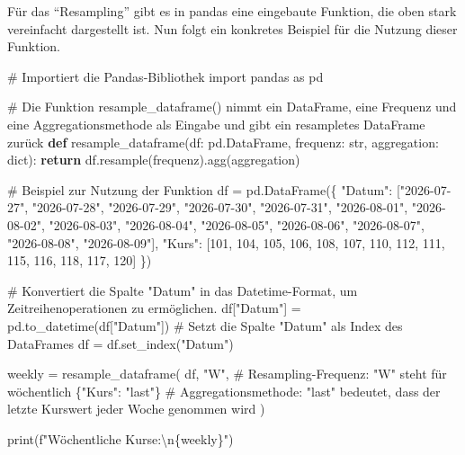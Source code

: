 \documentclass[
  ngerman,
  a4paper,
  DIV=11,
  oneside]{scrreprt}
\newenvironment{Shaded}{\begin{snugshade}}{\end{snugshade}}
\newcommand{\BuiltInTok}[1]{\textcolor[rgb]{0.00,0.23,0.31}{#1}}
\newcommand{\CharTok}[1]{\textcolor[rgb]{0.13,0.47,0.30}{#1}}
\newcommand{\CommentTok}[1]{\textcolor[rgb]{0.37,0.37,0.37}{#1}}
\newcommand{\ControlFlowTok}[1]{\textcolor[rgb]{0.00,0.23,0.31}{\textbf{#1}}}
\newcommand{\DecValTok}[1]{\textcolor[rgb]{0.68,0.00,0.00}{#1}}
\newcommand{\ImportTok}[1]{\textcolor[rgb]{0.00,0.46,0.62}{#1}}
\newcommand{\KeywordTok}[1]{\textcolor[rgb]{0.00,0.23,0.31}{\textbf{#1}}}
\newcommand{\NormalTok}[1]{\textcolor[rgb]{0.00,0.23,0.31}{#1}}
\newcommand{\OperatorTok}[1]{\textcolor[rgb]{0.37,0.37,0.37}{#1}}
\newcommand{\SpecialCharTok}[1]{\textcolor[rgb]{0.37,0.37,0.37}{#1}}
\newcommand{\SpecialStringTok}[1]{\textcolor[rgb]{0.13,0.47,0.30}{#1}}
\newcommand{\StringTok}[1]{\textcolor[rgb]{0.13,0.47,0.30}{#1}}
\begin{document}
Für das ``Resampling'' gibt es in pandas eine eingebaute Funktion, die
oben stark vereinfacht dargestellt ist. Nun folgt ein konkretes Beispiel
für die Nutzung dieser Funktion.

\begin{Shaded}
\begin{Highlighting}[]
\CommentTok{\# Importiert die Pandas{-}Bibliothek}
\ImportTok{import}\NormalTok{ pandas }\ImportTok{as}\NormalTok{ pd}

\CommentTok{\# Die Funktion resample\_dataframe() nimmt ein DataFrame, eine Frequenz und eine Aggregationsmethode als Eingabe und gibt ein resampletes DataFrame zurück}
\KeywordTok{def}\NormalTok{ resample\_dataframe(df: pd.DataFrame, frequenz: }\BuiltInTok{str}\NormalTok{, aggregation: }\BuiltInTok{dict}\NormalTok{):}
    \ControlFlowTok{return}\NormalTok{ df.resample(frequenz).agg(aggregation)}

\CommentTok{\# Beispiel zur Nutzung der Funktion}
\NormalTok{df }\OperatorTok{=}\NormalTok{ pd.DataFrame(\{}
    \StringTok{"Datum"}\NormalTok{: [}\StringTok{"2026{-}07{-}27"}\NormalTok{, }\StringTok{"2026{-}07{-}28"}\NormalTok{, }\StringTok{"2026{-}07{-}29"}\NormalTok{, }\StringTok{"2026{-}07{-}30"}\NormalTok{, }\StringTok{"2026{-}07{-}31"}\NormalTok{, }\StringTok{"2026{-}08{-}01"}\NormalTok{, }\StringTok{"2026{-}08{-}02"}\NormalTok{, }\StringTok{"2026{-}08{-}03"}\NormalTok{, }\StringTok{"2026{-}08{-}04"}\NormalTok{, }\StringTok{"2026{-}08{-}05"}\NormalTok{, }\StringTok{"2026{-}08{-}06"}\NormalTok{, }\StringTok{"2026{-}08{-}07"}\NormalTok{, }\StringTok{"2026{-}08{-}08"}\NormalTok{, }\StringTok{"2026{-}08{-}09"}\NormalTok{],}
    \StringTok{"Kurs"}\NormalTok{: [}\DecValTok{101}\NormalTok{, }\DecValTok{104}\NormalTok{, }\DecValTok{105}\NormalTok{, }\DecValTok{106}\NormalTok{, }\DecValTok{108}\NormalTok{, }\DecValTok{107}\NormalTok{, }\DecValTok{110}\NormalTok{, }\DecValTok{112}\NormalTok{, }\DecValTok{111}\NormalTok{, }\DecValTok{115}\NormalTok{, }\DecValTok{116}\NormalTok{, }\DecValTok{118}\NormalTok{, }\DecValTok{117}\NormalTok{, }\DecValTok{120}\NormalTok{]}
\NormalTok{\})}

\CommentTok{\# Konvertiert die Spalte "Datum" in das Datetime{-}Format, um Zeitreihenoperationen zu ermöglichen.}
\NormalTok{df[}\StringTok{"Datum"}\NormalTok{] }\OperatorTok{=}\NormalTok{ pd.to\_datetime(df[}\StringTok{"Datum"}\NormalTok{])}
\CommentTok{\# Setzt die Spalte "Datum" als Index des DataFrames}
\NormalTok{df }\OperatorTok{=}\NormalTok{ df.set\_index(}\StringTok{"Datum"}\NormalTok{)}

\NormalTok{weekly }\OperatorTok{=}\NormalTok{ resample\_dataframe(}
\NormalTok{    df,}
    \StringTok{"W"}\NormalTok{, }\CommentTok{\# Resampling{-}Frequenz: "W" steht für wöchentlich}
\NormalTok{    \{}\StringTok{"Kurs"}\NormalTok{: }\StringTok{"last"}\NormalTok{\} }\CommentTok{\# Aggregationsmethode: "last" bedeutet, dass der letzte Kurswert jeder Woche genommen wird}
\NormalTok{)}

\BuiltInTok{print}\NormalTok{(}\SpecialStringTok{f"Wöchentliche Kurse:}\CharTok{\textbackslash{}n}\SpecialCharTok{\{}\NormalTok{weekly}\SpecialCharTok{\}}\SpecialStringTok{"}\NormalTok{)}
\end{Highlighting}
\end{Shaded}
\end{document}

